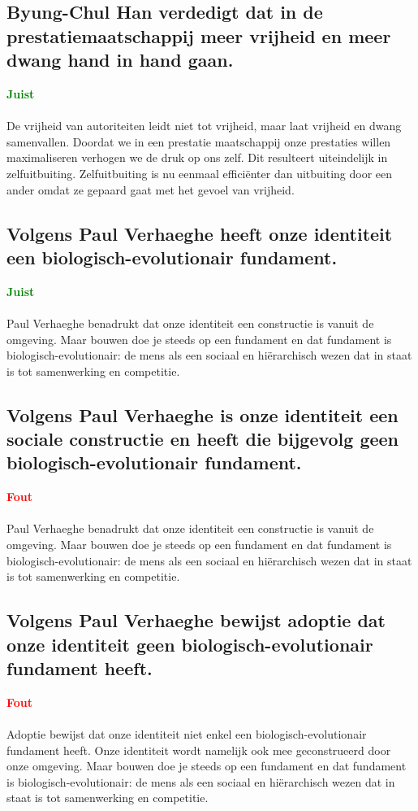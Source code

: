 \documentclass[11pt,a4paper,titlepage]{article}
\begin{document}
\subsection{Byung-Chul Han verdedigt dat in de prestatiemaatschappij meer vrijheid en meer dwang hand in hand gaan.}
\textcolor{green}{\textbf{Juist}}\\\\
De vrijheid van autoriteiten leidt niet tot vrijheid, maar laat vrijheid en dwang samenvallen. Doordat we in een prestatie maatschappij onze prestaties willen maximaliseren verhogen we de druk op ons zelf. Dit resulteert uiteindelijk in zelfuitbuiting. Zelfuitbuiting is nu eenmaal efficiënter dan uitbuiting door een ander omdat ze gepaard gaat met het gevoel van vrijheid.

\subsection{Volgens Paul Verhaeghe heeft onze identiteit een biologisch-evolutionair fundament.}
\textcolor{green}{\textbf{Juist}}\\\\
Paul Verhaeghe benadrukt dat onze identiteit een constructie is vanuit de omgeving. Maar bouwen doe je steeds op een fundament en dat fundament is biologisch-evolutionair: de mens als een sociaal en hiërarchisch wezen dat in staat is tot samenwerking en competitie.

\subsection{Volgens Paul Verhaeghe is onze identiteit een sociale constructie en heeft die bijgevolg geen biologisch-evolutionair fundament.}
\textcolor{red}{\textbf{Fout}}\\\\
Paul Verhaeghe benadrukt dat onze identiteit een constructie is vanuit de omgeving. Maar bouwen doe je steeds op een fundament en dat fundament is biologisch-evolutionair: de mens als een sociaal en hiërarchisch wezen dat in staat is tot samenwerking en competitie.

\subsection{Volgens Paul Verhaeghe bewijst adoptie dat onze identiteit geen biologisch-evolutionair fundament heeft.}
\textcolor{red}{\textbf{Fout}}\\\\
Adoptie bewijst dat onze identiteit niet enkel een biologisch-evolutionair fundament heeft. Onze identiteit wordt namelijk ook mee geconstrueerd door onze omgeving. Maar bouwen doe je steeds op een fundament en dat fundament is biologisch-evolutionair: de mens als een sociaal en hiërarchisch wezen dat in staat is tot samenwerking en competitie.
\end{document}
